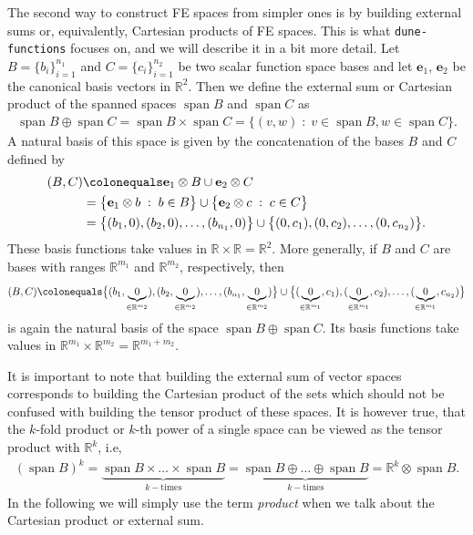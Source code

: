 \documentclass[a4paper,10pt,headings=normal,bibliography=totoc]{scrartcl}
\newcommand{\R}{\mathbb{R}}
\newcommand{\op}[1]{\operatorname{#1}}
\newcommand{\st}{\; : \;}
\newcommand{\dunemodule}[1]{\texttt{#1}}
\begin{document}
The second way to construct FE spaces from simpler ones is by building external sums or,
equivalently, Cartesian products of FE spaces.  This is what
\dunemodule{dune-functions} focuses on, and we will describe it in a bit more detail.
Let $B = \{b_i\}_{i=1}^{n_1}$ and $C = \{c_i\}_{i=1}^{n_2}$ be two scalar function space bases and let $\mathbf{e}_1$, $\mathbf{e}_2$ be the canonical
basis vectors in $\R^2$.
Then we define the external sum or Cartesian product of the spanned spaces $\op{span}B$ and $\op{span} C$ as
\begin{align*}
    \operatorname{span} B \oplus \operatorname{span} C
    = \operatorname{span} B \times \operatorname{span} C
    = \big\{ (v,w) \st v \in \op{span} B, w \in \op{span} C \big\}.
\end{align*}
A natural basis of this space is given by the concatenation
of the bases $B$ and $C$ defined by
\begin{align*}
(B,C)
 & \colonequals
    \mathbf{e}_1 \otimes B \cup \mathbf{e}_2 \otimes C \\
    &= \big\{ \mathbf{e}_1 \otimes b \st b \in B \big\}
    \cup \big\{ \mathbf{e}_2 \otimes c \st c \in C \big\} \\
 & =
 \big\{(b_1,0), (b_2,0), \dots, (b_{n_1},0) \big\} \cup \big\{(0,c_1), (0,c_2), \dots, (0,c_{n_2})\big\}.
\end{align*}
These basis functions take values in $\R \times \R = \R^2$.
More generally, if $B$ and $C$ are bases with ranges $\R^{m_1}$
and $\R^{m_2}$, respectively, then
\begin{equation*}
    (B,C)
 \colonequals
 \big\{(b_1,\underbrace{0}_{\in \R^{m_2}}), (b_2,\underbrace{0}_{\in \R^{m_2}}), \dots, (b_{n_1},\underbrace{0}_{\in \R^{m_2}})\big\}
 \cup
 \big\{(\underbrace{0}_{\in \R^{m_1}}, c_1), (\underbrace{0}_{\in \R^{m_1}},c_2), \dots, (\underbrace{0}_{\in \R^{m_1}}, c_{n_2})\big\}
\end{equation*}
is again the natural basis of the space $\operatorname{span} B \oplus \operatorname{span} C$.  Its basis functions take values in
$\R^{m_1} \times \R^{m_2} = \R^{m_1+m_2}$.

It is important to note that building the external sum of vector spaces
corresponds to building the Cartesian product of the sets which should not
be confused with building the tensor product of these spaces.
It is however true, that the $k$-fold product or $k$-th power
of a single space can be viewed as the tensor product with $\R^k$, i.e,
\begin{align*}
    (\op{span} B)^k
    = \underbrace{\op{span}B \times \dots \times \op{span}B}_{k-\text{times}}
    = \underbrace{\op{span}B \oplus \dots \oplus \op{span}B}_{k-\text{times}}
    = \R^k \otimes \op{span} B.
\end{align*} 
In the following we will simply use the term \emph{product}
when we talk about the Cartesian product or external sum.
\end{document}
